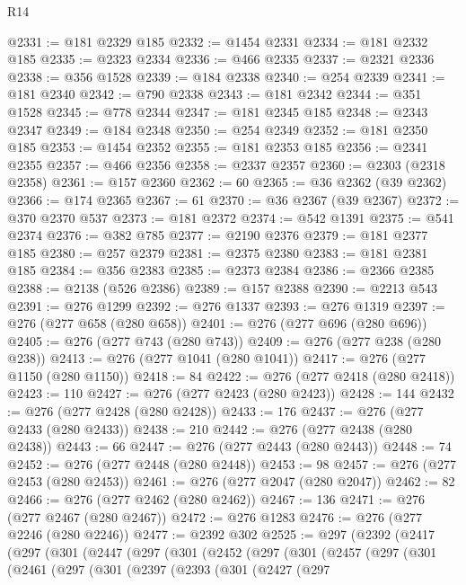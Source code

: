 \begin{lexlean}{R14}
\begin{coremodule}
@2331 := @181 @2329 @185
@2332 := @1454 @2331
@2334 := @181 @2332 @185
@2335 := @2323 @2334
@2336 := @466 @2335
@2337 := @2321 @2336
@2338 := @356 @1528
@2339 := @184 @2338
@2340 := @254 @2339
@2341 := @181 @2340
@2342 := @790 @2338
@2343 := @181 @2342
@2344 := @351 @1528
@2345 := @778 @2344
@2347 := @181 @2345 @185
@2348 := @2343 @2347
@2349 := @184 @2348
@2350 := @254 @2349
@2352 := @181 @2350 @185
@2353 := @1454 @2352
@2355 := @181 @2353 @185
@2356 := @2341 @2355
@2357 := @466 @2356
@2358 := @2337 @2357
@2360 := @2303 (@2318 @2358)
@2361 := @157 @2360
@2362 := 60
@2365 := @36 @2362 (@39 @2362)
@2366 := @174 @2365
@2367 := 61
@2370 := @36 @2367 (@39 @2367)
@2372 := @370 @2370 @537
@2373 := @181 @2372
@2374 := @542 @1391
@2375 := @541 @2374
@2376 := @382 @785
@2377 := @2190 @2376
@2379 := @181 @2377 @185
@2380 := @257 @2379
@2381 := @2375 @2380
@2383 := @181 @2381 @185
@2384 := @356 @2383
@2385 := @2373 @2384
@2386 := @2366 @2385
@2388 := @2138 (@526 @2386)
@2389 := @157 @2388
@2390 := @2213 @543
@2391 := @276 @1299
@2392 := @276 @1337
@2393 := @276 @1319
@2397 := @276 (@277 @658 (@280 @658))
@2401 := @276 (@277 @696 (@280 @696))
@2405 := @276 (@277 @743 (@280 @743))
@2409 := @276 (@277 @238 (@280 @238))
@2413 := @276 (@277 @1041 (@280 @1041))
@2417 := @276 (@277 @1150 (@280 @1150))
@2418 := 84
@2422 := @276 (@277 @2418 (@280 @2418))
@2423 := 110
@2427 := @276 (@277 @2423 (@280 @2423))
@2428 := 144
@2432 := @276 (@277 @2428 (@280 @2428))
@2433 := 176
@2437 := @276 (@277 @2433 (@280 @2433))
@2438 := 210
@2442 := @276 (@277 @2438 (@280 @2438))
@2443 := 66
@2447 := @276 (@277 @2443 (@280 @2443))
@2448 := 74
@2452 := @276 (@277 @2448 (@280 @2448))
@2453 := 98
@2457 := @276 (@277 @2453 (@280 @2453))
@2461 := @276 (@277 @2047 (@280 @2047))
@2462 := 82
@2466 := @276 (@277 @2462 (@280 @2462))
@2467 := 136
@2471 := @276 (@277 @2467 (@280 @2467))
@2472 := @276 @1283
@2476 := @276 (@277 @2246 (@280 @2246))
@2477 := @2392 @302
@2525 := @297
    (@2392
      (@2417
        (@297
          (@301
            (@2447
              (@297
                (@301
                  (@2452
                    (@297
                      (@301
                        (@2457
                          (@297
                            (@301
                              (@2461
                                (@297
                                  (@301
                                    (@2397
                                      (@2393
                                        (@301
                                          (@2427
                                            (@297

\end{coremodule}
\end{lexlean}
